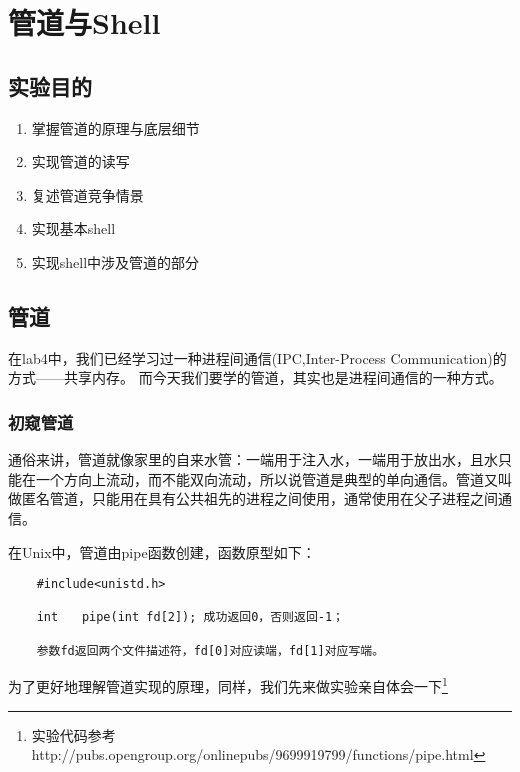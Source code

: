 \usepackage{ulem}
\usepackage{amssymb}
\usepackage{amsmath}

\chapter{管道与Shell}
\section{实验目的}
\begin{enumerate}
	\item 掌握管道的原理与底层细节
	\item 实现管道的读写
	\item 复述管道竞争情景
	\item 实现基本shell
	\item 实现shell中涉及管道的部分
\end{enumerate}

\section{管道}

在lab4中，我们已经学习过一种进程间通信(IPC,Inter-Process Communication)的方式——共享内存。
而今天我们要学的管道，其实也是进程间通信的一种方式。

\subsection{初窥管道}

通俗来讲，管道就像家里的自来水管：一端用于注入水，一端用于放出水，且水只能在一个方向上流动，而不能双向流动，所以说管道是典型的单向通信。管道又叫做匿名管道，只能用在具有公共祖先的进程之间使用，通常使用在父子进程之间通信。
 
在Unix中，管道由pipe函数创建，函数原型如下：

\begin{verbatim}
	#include<unistd.h>
	
	int　　pipe(int fd[2]); 成功返回0，否则返回-1；
	
	参数fd返回两个文件描述符，fd[0]对应读端，fd[1]对应写端。
\end{verbatim}

为了更好地理解管道实现的原理，同样，我们先来做实验亲自体会一下\footnote{实验代码参考 http://pubs.opengroup.org/onlinepubs/9699919799/functions/pipe.html}

